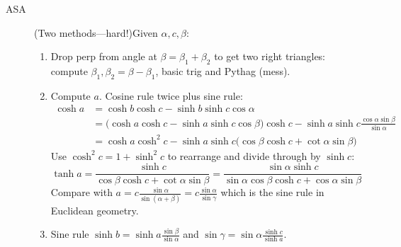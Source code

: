 \begin{description}
	\item[ASA] (Two methods---hard!)\lstsp Given $\alpha,c,\beta$:
	\begin{enumerate}
	  \item Drop perp from angle at $\beta=\beta_1+\beta_2$ to get two right triangles: compute $\beta_1,\beta_2=\beta-\beta_1$, basic trig and Pythag (mess).
	  \item Compute $a$. Cosine rule twice plus sine rule:
	  \begin{align*}
	  \cosh a&=\cosh b\cosh c-\sinh b\sinh c\cos\alpha\\
	  &=\bigl(\cosh a\cosh c-\sinh a\sinh c\cos\beta\bigr)\cosh c-\sinh a\sinh c\frac{\cos\alpha\sin\beta}{\sin\alpha}\\
	  &=\cosh a\cosh^2c-\sinh a\sinh c\bigl(\cos\beta\cosh c+\cot\alpha\sin\beta\bigr)
	  \end{align*}
	  Use $\cosh^2c=1+\sinh^2c$ to rearrange and divide through by $\sinh c$:
	  \[\tanh a=\frac{\sinh c}{\cos\beta\cosh c+\cot\alpha\sin\beta}= \frac{\sin\alpha\sinh c}{\sin\alpha\cos\beta\cosh c+\cos\alpha\sin\beta}\]
	  Compare with $a=c\frac{\sin\alpha}{\sin(\alpha+\beta)} =c\frac{\sin\alpha}{\sin\gamma}$ which is the sine rule in Euclidean geometry.
	  \item Sine rule $\sinh b=\sinh a\frac{\sin\beta}{\sin\alpha}$ and $\sin\gamma=\sin\alpha\frac{\sinh c}{\sinh a}$.
	\end{enumerate}
	

\end{description}
